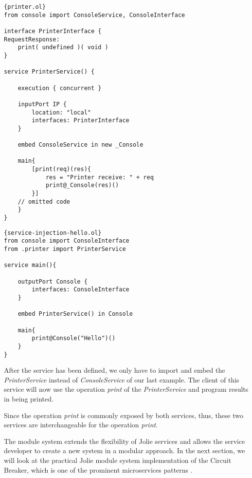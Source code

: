 \begin{listing}[H]
    \lstset{language=Jolie,
        style=codeStyle,
        numbers=left,
        firstnumber=1
    }
    \begin{lstlisting}[frame=tlrb]{printer.ol}
from console import ConsoleService, ConsoleInterface

interface PrinterInterface {
RequestResponse:
    print( undefined )( void )
}

service PrinterService() {

    execution { concurrent }
    
    inputPort IP {
        location: "local"
        interfaces: PrinterInterface
    }

    embed ConsoleService in new _Console

    main{
        [print(req)(res){
            res = "Printer receive: " + req
            print@_Console(res)()
        }]
	// omitted code
    }
}
\end{lstlisting}
\end{listing}

\begin{listing}[H]
    \lstset{language=Jolie,
        style=codeStyle,
        numbers=left,
        firstnumber=1
    }
    \begin{lstlisting}[frame=tlrb]{service-injection-hello.ol}
from console import ConsoleInterface
from .printer import PrinterService

service main(){

    outputPort Console {
        interfaces: ConsoleInterface
    }

    embed PrinterService() in Console

    main{
        print@Console("Hello")()
    }
}
\end{lstlisting}
\end{listing}

After the service has been defined, we only have to import and embed the \textit{PrinterService} instead of \textit{ConsoleService} of our last example. The client of this service will now use the operation \textit{print} of the \textit{PrinterService} and program results in  being printed.

Since the operation \textit{print} is commonly exposed by both services, thus, these two services are interchangeable for the operation \textit{print}. 

The module system extends the flexibility of Jolie services and allows the service developer to create a new system in a modular approach. In the next section, we will look at the practical Jolie module system implementation of the Circuit Breaker, which is one of the prominent microservices patterns \cite{nygard2007release}.

